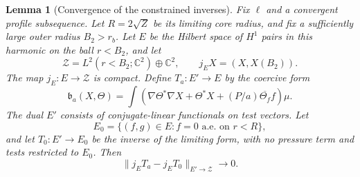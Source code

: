 \documentclass[11pt]{article}
\numberwithin{equation}{section}
\newtheorem{lemma}[theorem]{Lemma}
\theoremstyle{definition}
\theoremstyle{remark}
\begin{document}
\begin{lemma}[Convergence of the constrained inverses]\label{spec:inverse-limit}
Fix $\ell$ and a convergent profile subsequence. Let $R=2\sqrt Z$ be
its limiting core radius, and fix a sufficiently large outer radius
$B_2>r_b$. Let $E$ be the Hilbert space of $H^1$ pairs in this harmonic
on the ball $r<B_2$, and let
\[
 \mathscr Z=L^2(r<B_2;\mathbb C^2)\oplus\mathbb C^2,\qquad
 j_E X=(X,X(B_2)).
\]
The map $j_E:E\to\mathscr Z$ is compact. Define $T_a:E'\to E$ by the
coercive form
\begin{equation}\label{spec:base-form}
 \mathfrak b_a(X,\Theta)=
 \int\left(\nabla\Theta^*\nabla X+\Theta^*X
                         +(P/a)\overline{\Theta_f}f\right)\mu.
\end{equation}
The dual $E'$ consists of conjugate-linear functionals on test vectors.
Let
\[
 E_0=\{(f,g)\in E:f=0\text{ a.e. on }r<R\},
\]
and let $T_0:E'\to E_0$ be the inverse of the limiting form, with no
pressure term and tests restricted to $E_0$. Then
\begin{equation}\label{spec:inverse-norm}
 \|j_ET_a-j_ET_0\|_{E'\to\mathscr Z}\longrightarrow0.
\end{equation}
\end{lemma}
\end{document}
